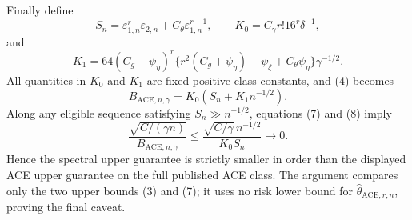 Finally define
\[
 S_n=\varepsilon_{1,n}^r\varepsilon_{2,n}
     +C_{\theta}\varepsilon_{1,n}^{r+1},
 \qquad
 K_0=C_{\gamma}r!16^r\delta^{-1},
\]
and
\[
 K_1=64(C_g+\psi_{\eta})^r
 \{r^2(C_g+\psi_{\eta})+\psi_{\xi}
      +C_{\theta}\psi_{\eta}\}\gamma^{-1/2}.
\]
All quantities in \(K_0\) and \(K_1\) are fixed positive class constants, and (4) becomes
\[
 B_{\mathrm{ACE},n,\gamma}=K_0(S_n+K_1n^{-1/2}).
 \tag{8}
\]
Along any eligible sequence satisfying \(S_n\gg n^{-1/2}\), equations (7) and (8) imply
\[
 \frac{\sqrt{C/(\gamma n)}}{B_{\mathrm{ACE},n,\gamma}}
 \le
 \frac{\sqrt{C/\gamma}\,n^{-1/2}}{K_0S_n}
 \longrightarrow0.
\]
Hence the spectral upper guarantee is strictly smaller in order than the displayed ACE upper guarantee on the full published ACE class.  The argument compares only the two upper bounds (3) and (7); it uses no risk lower bound for \(\widehat\theta_{\mathrm{ACE},r,n}\), proving the final caveat.